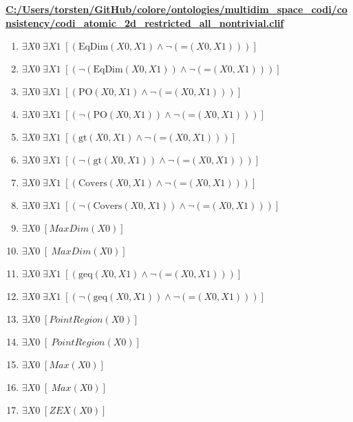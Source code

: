 \documentclass{article}
\begin{document}
\textbf{\url{C:/Users/torsten/GitHub/colore/ontologies/multidim\_space\_codi/consistency/codi\_atomic\_2d\_restricted\_all\_nontrivial.clif}}

\begin{enumerate}
\item $\exists X0\; \exists X1\;  \left[ \left(\textrm{EqDim}(X0,X1) \land \neg \left(\textrm{=}(X0,X1)\right)\right) \right]$
\item $\exists X0\; \exists X1\;  \left[ \left(\neg \left(\textrm{EqDim}(X0,X1)\right) \land \neg \left(\textrm{=}(X0,X1)\right)\right) \right]$
\item $\exists X0\; \exists X1\;  \left[ \left(\textrm{PO}(X0,X1) \land \neg \left(\textrm{=}(X0,X1)\right)\right) \right]$
\item $\exists X0\; \exists X1\;  \left[ \left(\neg \left(\textrm{PO}(X0,X1)\right) \land \neg \left(\textrm{=}(X0,X1)\right)\right) \right]$
\item $\exists X0\; \exists X1\;  \left[ \left(\textrm{gt}(X0,X1) \land \neg \left(\textrm{=}(X0,X1)\right)\right) \right]$
\item $\exists X0\; \exists X1\;  \left[ \left(\neg \left(\textrm{gt}(X0,X1)\right) \land \neg \left(\textrm{=}(X0,X1)\right)\right) \right]$
\item $\exists X0\; \exists X1\;  \left[ \left(\textrm{Covers}(X0,X1) \land \neg \left(\textrm{=}(X0,X1)\right)\right) \right]$
\item $\exists X0\; \exists X1\;  \left[ \left(\neg \left(\textrm{Covers}(X0,X1)\right) \land \neg \left(\textrm{=}(X0,X1)\right)\right) \right]$
\item $\exists X0\;  \left[ MaxDim(X0) \right]$
\item $\exists X0\;  \left[ ~MaxDim(X0) \right]$
\item $\exists X0\; \exists X1\;  \left[ \left(\textrm{geq}(X0,X1) \land \neg \left(\textrm{=}(X0,X1)\right)\right) \right]$
\item $\exists X0\; \exists X1\;  \left[ \left(\neg \left(\textrm{geq}(X0,X1)\right) \land \neg \left(\textrm{=}(X0,X1)\right)\right) \right]$
\item $\exists X0\;  \left[ PointRegion(X0) \right]$
\item $\exists X0\;  \left[ ~PointRegion(X0) \right]$
\item $\exists X0\;  \left[ Max(X0) \right]$
\item $\exists X0\;  \left[ ~Max(X0) \right]$
\item $\exists X0\;  \left[ ZEX(X0) \right]$

\end{enumerate}
\end{document}
